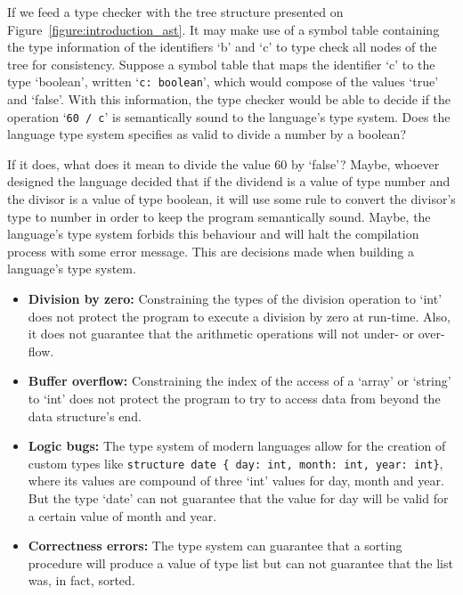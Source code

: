 \documentclass[
    oneside,
    english,
    embeddedlogo,
    noabntexcite
]{ufsc-thesis-rn46-2019}
\begin{document}
If we feed a type checker with the tree structure presented on Figure~\ref{figure:introduction_ast}.
It may make use of a symbol table containing the type information of the identifiers `b' and `c' to type check all nodes of the tree for consistency.
Suppose a symbol table that maps the identifier `c' to the type `boolean', written `\verb+c: boolean+', which would compose of the values `true' and `false'.
With this information, the type checker would be able to decide if the operation `\verb+60 / c+' is semantically sound to the language's type system.
Does the language type system specifies as valid to divide a number by a boolean?


If it does, what does it mean to divide the value 60 by `false'?
Maybe, whoever designed the language decided that if the dividend is a value of type number and the divisor is a value of type boolean, it will use some rule to convert the divisor's type to number in order to keep the program semantically sound.
Maybe, the language's type system forbids this behaviour and will halt the compilation process with some error message.
This are decisions made when building a language's type system.


\begin{itemize}
    \item \textbf{Division by zero:} Constraining the types of the division operation to `int' does not protect the program to execute a division by zero at run-time.
          Also, it does not guarantee that the arithmetic operations will not under- or over-flow.
    \item \textbf{Buffer overflow:} Constraining the index of the access of a `array' or `string' to `int' does not protect the program to try to access data from beyond the data structure's end.
    \item \textbf{Logic bugs:} The type system of modern languages allow for the creation of custom types like \verb+structure date { day: int, month: int, year: int}+, where its values are compound of three `int' values for day, month and year.
          But the type `date' can not guarantee that the value for day will be valid for a certain value of month and year.
    \item \textbf{Correctness errors:} The type system can guarantee that a sorting procedure will produce a value of type list  but can not guarantee that the list was, in fact, sorted.
\end{itemize}
\end{document}
